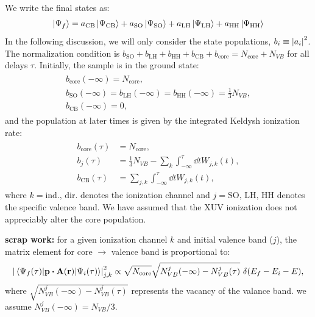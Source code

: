 We write the final states as:
\begin{equation}
\ket{\Psi_f} = a_{\textrm{CB}} \ket{\Psi_{\textrm{CB}}} + a_{\textrm{SO}} \ket{\Psi_{\textrm{SO}}} + a_{\textrm{LH}} \ket{\Psi_{\textrm{LH}}} + a_{\textrm{HH}} \ket{\Psi_{\textrm{HH}}}
\end{equation}
In the following discussion, we will only consider the state populations, $b_i \equiv \abs{a_i}^2$. The normalization condition is $b_{\textrm{SO}} + b_{\textrm{LH}} + b_{\textrm{HH}} + b_{\textrm{CB}} + b_{\textrm{core}}= N_{\textrm{core}} + N_{VB}$ for all delays $\tau$. Initially, the sample is in the ground state:
\begin{align}
\begin{split}
b_{\textrm{core}}(-\infty) = N_{\textrm{core}}, \\
b_{\textrm{SO}}(-\infty) = b_{\textrm{LH}}(-\infty) = b_{\textrm{HH}}(-\infty) = \frac{1}{3} N_{VB}, \\
b_{\textrm{CB}}(-\infty) = 0,
\end{split}
\end{align}
and the population at later times is given by the integrated Keldysh ionization rate:
\begin{align}
\begin{split}
b_{\textrm{core}} (\tau) &= N_{\textrm{core}}, \\
b_{j}(\tau) &= \frac{1}{3}N_{VB} - \sum_{k} \int_{-\infty}^{\tau} \dd{t} W_{j,k}(t), \\
b_{\textrm{CB}}(\tau) &= \sum_{j,k} \int_{-\infty}^{\tau} \dd{t} W_{j,k}(t),
\end{split}
\end{align}
where $k=\textrm{ind., dir.}$ denotes the ionization channel and $j=\textrm{SO, LH, HH}$ denotes the specific valence band. We have assumed that the XUV ionization does not appreciably alter the core population.

\textbf{scrap work:}
for a given ionization channel $k$ and initial valence band ($j$), the matrix element for core $\rightarrow$ valence band is proportional to:
\begin{equation}
\left| \mel{\Psi_f(\tau)}{ \vb{p} \vdot \vb{A}(\vb{r}) }{\Psi_i(\tau)} \right|^2_{j,k}  \propto \sqrt{N_{\textrm{core}}} \sqrt{N^{j}_{VB}(-\infty) - N^{j}_{VB}(\tau)} \ \delta(E_f - E_i-E),
\end{equation}
where $\sqrt{N^{j}_{VB}(-\infty) - N^{j}_{VB}(\tau)}$ represents the vacancy of the valance band. we assume $N^{j}_{VB}(-\infty) = N_{VB} / 3$. 

